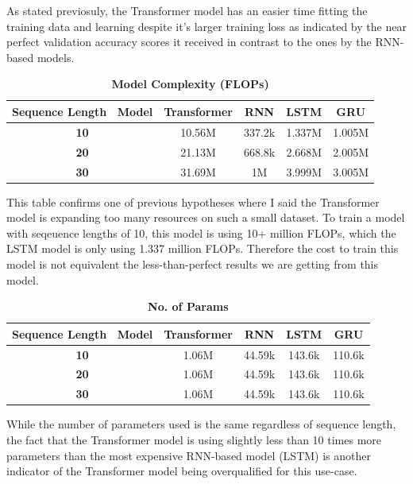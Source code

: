 \documentclass[a4paper]{article}
\begin{document}
As stated previosuly, the Transformer model has an easier time fitting the training data and learning despite it's larger training loss as indicated by the near perfect validation accuracy scores it received in contrast to the ones by the RNN-based models.

\begin{table}[H]
    \centering
    \caption{\textbf{Model Complexity (FLOPs)}}
    \label{tab:FLOPsp1}
    \begin{tabular}{| c || c | c | c | c |}
        \hline
        Sequence Length \ Model & \textbf{Transformer} & \textbf{RNN} & \textbf{LSTM} & \textbf{GRU} \\
        \hline
        \textbf{10} & 10.56M & 337.2k & 1.337M & 1.005M \\
        \hline
        \textbf{20} & 21.13M & 668.8k & 2.668M & 2.005M \\
        \hline
        \textbf{30} & 31.69M & 1M & 3.999M & 3.005M \\
        \hline
    \end{tabular}
\end{table}

This table confirms one of previous hypotheses where  I said the Transformer model is expanding too many resources on such a small dataset. To train a model with seqeuence lengths of 10, this model is using 10+ million FLOPs, which the LSTM model is only using 1.337 million FLOPs. Therefore the cost to train this model is not equivalent the less-than-perfect results we are getting from this model.

\begin{table}[H]
    \centering
    \caption{\textbf{No. of Params}}
    \label{tab:Paramsp1}
    \begin{tabular}{| c || c | c | c | c |}
        \hline
        Sequence Length \ Model & \textbf{Transformer} & \textbf{RNN} & \textbf{LSTM} & \textbf{GRU} \\
        \hline
        \textbf{10} & 1.06M & 44.59k & 143.6k & 110.6k \\
        \hline
        \textbf{20} & 1.06M & 44.59k & 143.6k & 110.6k \\
        \hline
        \textbf{30} & 1.06M & 44.59k & 143.6k & 110.6k \\
        \hline
    \end{tabular}
\end{table}

While the number  of parameters used is the same regardless of sequence length, the fact that the Transformer model is using slightly less than 10 times more parameters than the most expensive RNN-based model (LSTM) is another indicator of the Transformer model being overqualified for this use-case.
\end{document}
